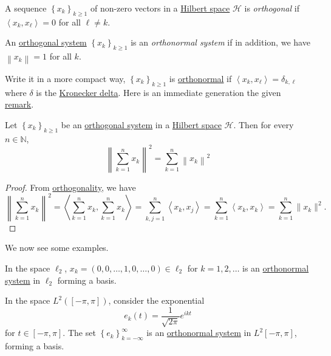 \begin{definition}\label{def:orthogonal-system}
	A sequence \(\left\{ x_{k} \right\}_{k\geq 1} \) of non-zero vectors in a \hyperref[def:Hilbert-space]{Hilbert space} \(\mathcal{H} \) is \emph{orthogonal} if \(\left\langle x_{k} , x_{\ell} \right\rangle = 0\) for all \(\ell \neq k\).
\end{definition}

\begin{definition}\label{def:orthonormal-system}
	An \hyperref[def:orthogonal-system]{orthogonal system} \(\left\{ x_{k} \right\}_{k\geq 1} \) is an \emph{orthonormal system} if in addition, we have \(\left\lVert x_{k} \right\rVert= 1 \) for all \(k\).
\end{definition}

Write it in a more compact way, \(\left\{ x_{k} \right\}_{k\geq 1} \) is \hyperref[def:orthonormal-system]{orthonormal} if \(\left\langle x_{k} , x_{\ell } \right\rangle = \delta _{k, \ell } \) where \(\delta \) is the \href{https://en.wikipedia.org/wiki/Kronecker_delta}{Kronecker delta}. Here is an immediate generation the given \hyperref[rmk:Pythagorean-theorem]{remark}.

\begin{theorem}\label{thm:Pythagorean-theorem}
	Let \(\left\{ x_k \right\} _{k\geq 1}\) be an \hyperref[def:orthogonal-system]{orthogonal system} in a \hyperref[def:Hilbert-space]{Hilbert space} \(\mathcal{H} \). Then for every \(n \in \mathbb{N}\),
	\[
		\left\lVert \sum_{k=1} ^n x_k\right\rVert ^{2} = \sum_{k=1} ^n \left\lVert x_k\right\rVert ^{2}
	\]
\end{theorem}
\begin{proof}
	From \hyperref[def:orthogonal]{orthogonality}, we have
	\[
		\left\lVert \sum_{k=1}^{n} x_k \right\rVert ^2
		= \left\langle \sum_{k=1} ^n x_k, \sum_{k=1} ^n x_k \right\rangle
		= \sum_{k, j= 1}^n \left\langle x_k, x_j \right\rangle
		= \sum_{k=1} ^n \left\langle x_k, x_k \right\rangle
		= \sum_{k=1}^{n} \lVert x_k \rVert ^2.
	\]
\end{proof}

We now see some examples.

\begin{eg}
	In the space \(\ell _2\), \(x_{k} = (0, 0, \dots , 1 , 0, \dots , 0 )\in \ell _2\) for \(k = 1, 2, \dots\) is an \hyperref[def:orthonormal-system]{orthonormal system} in \(\ell _2\) forming a basis.
\end{eg}
\begin{eg}
	In the space \(L^2([-\pi , \pi ])\), consider the exponential
	\[
		e_k (t) = \frac{1}{\sqrt{2\pi } }e^{ikt}
	\]
	for \(t\in [-\pi , \pi ]\). The set \(\left\{ e_k \right\} _{k=-\infty }^{\infty} \) is an \hyperref[def:orthonormal-system]{orthonormal system} in \(L^2[-\pi , \pi ]\), forming a basis.
\end{eg}

